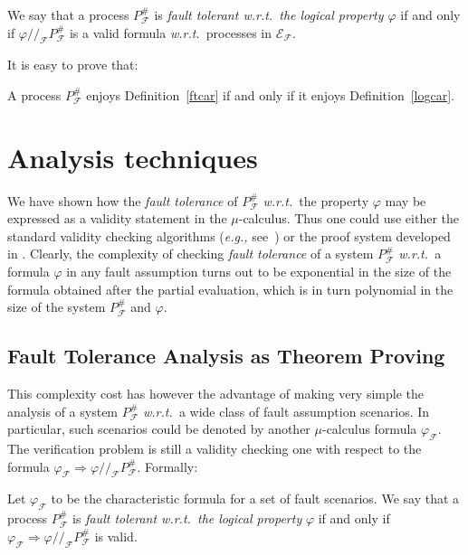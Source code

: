 \documentclass{entcs}
\newcommand{\eg}{\emph{e.g., }}
\newcommand{\wrt}{\emph{w.r.t.~}}
\newcommand{\quotres}[2]{\slash\!\!\slash_{#1} #2}
\newcommand{\Faults}{\mathcal{F}}
\newcommand{\faulttolerant}[1]{{#1}^{\#}_\Faults}
\newcommand{\env}[1]{\mathcal{E}_{#1}}
\newcommand{\faultenv}{\env{\Faults}}
\newcommand{\faultscenarios}{\faultenv}
\renewcommand{\implies}{\Rightarrow}
\begin{document}
\begin{definition}
  We say that a process $\faulttolerant{P}$ is \emph{fault tolerant \wrt the
    logical property $\varphi$} if and only if $ \varphi
    \quotres{\Faults}{\faulttolerant{P}}$
  is a valid formula \wrt processes in $\faultscenarios$.
\label{logcar}
\end{definition}%

It is easy to prove that:
\begin{proposition} A process $\faulttolerant{P}$
  enjoys Definition~\ref{ftcar} if and only if it enjoys
  Definition~\ref{logcar}.
\end{proposition}%

\section{Analysis techniques}
\label{logicanalysis:sec}

We have shown how the {\em fault tolerance} of $\faulttolerant{P}$ \wrt the
property $\varphi$ may be expressed as a validity statement in the
$\mu$-calculus. Thus one could use either the standard validity checking
algorithms (\eg see~\cite{Street89}) or the proof system developed in
\cite{LICS95*14}. Clearly, the complexity of checking {\em fault tolerance}
of a system $\faulttolerant{P}$ \wrt a formula $\varphi$ in any fault
assumption turns out to be exponential in the size of the formula obtained
after the partial evaluation, which is in turn polynomial in the size of the
system $\faulttolerant{P}$ and $\varphi$.

\subsection{Fault Tolerance Analysis as  Theorem Proving}
This complexity cost has however the advantage of making very simple the
analysis of a system $\faulttolerant{P}$ \wrt a wide class of fault
assumption scenarios. In particular, such scenarios could be denoted by
another  $\mu$-calculus formula $\varphi_{\Faults}$.
 The verification problem is still a validity checking one
with respect to the formula $\varphi_{\Faults}\implies \varphi
\quotres{\Faults}{\faulttolerant{P}}$. Formally:

\begin{definition}
  Let $\varphi_{\Faults}$ to be the characteristic formula for a set of fault scenarios.
   We say that a process $\faulttolerant{P}$ is \emph{fault
    tolerant \wrt the logical property} $\varphi$ if and only if
  $\varphi_{\Faults} \implies \varphi \quotres{\Faults}{\faulttolerant{P}}$ is valid.
\end{definition}%
\end{document}
